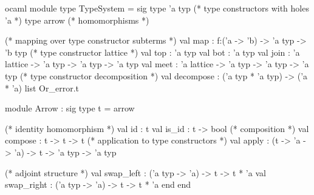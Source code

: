 \begin{cminted}{ocaml}
module type TypeSystem = sig
  type 'a typ  (* type constructors with holes 'a *)
  type arrow   (* homomorphisms *)

  (* mapping over type constructor subterms *)
  val map : f:('a -> 'b) -> 'a typ -> 'b typ
  (* type constructor lattice *)
  val top : 'a typ
  val bot : 'a typ
  val join : 'a lattice -> 'a typ -> 'a typ -> 'a typ
  val meet : 'a lattice -> 'a typ -> 'a typ -> 'a typ
  (* type constructor decomposition *)
  val decompose : ('a typ * 'a typ) -> ('a * 'a) list Or_error.t

  module Arrow : sig
    type t = arrow

    (* identity homomorphism *)
    val id : t
    val is_id : t -> bool
    (* composition *)
    val compose : t -> t -> t
    (* application to type constructors *)
    val apply : (t -> 'a -> 'a) -> t -> 'a typ -> 'a typ

    (* adjoint structure *)
    val swap_left : ('a typ -> 'a) -> t -> t * 'a
    val swap_right : ('a typ -> 'a) -> t -> t * 'a
  end
end
\end{cminted}
